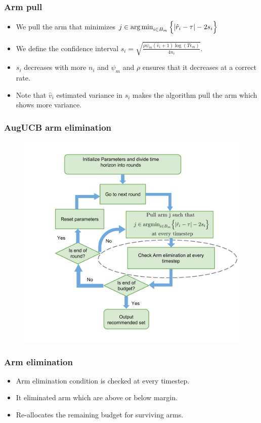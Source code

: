 \begin{frame}
\frametitle{Arm pull}
\begin{itemize}
\item<1-> We pull the arm that minimizes $j\in\operatorname*{arg\,min}_{i\in B_{m}}\Big\lbrace |\hat{r}_{i} - \tau | - 2s_{i}\Big\rbrace$
\item<2-> We define the confidence interval $s_i  = \sqrt{\frac{\rho\psi_m (\hat{v}_{i}+1) \log ( T \epsilon_{m})}{4 n_{i}}}$.
\item<3-> $s_i$ decreases with more $n_i$ and $\psi_m$ and $\rho$ ensures that it decreases at a correct rate.
\item<4-> Note that $\hat{v}_i$ estimated variance in $s_i$ makes the algorithm pull the arm which shows more variance. 
\end{itemize}
\end{frame}

\begin{frame}
\frametitle{AugUCB arm elimination}
\begin{figure}
\includegraphics[scale=0.24]{img/AugUCB_flow_elim.png}
\end{figure}
\end{frame}


\begin{frame}
\frametitle{Arm elimination}
\begin{itemize}
\item<1-> Arm elimination condition is checked at every timestep.
\item<2-> It eliminated arm which are above or below margin.
\item<3-> Re-allocates the remaining budget for surviving arms. 
\end{itemize}
\end{frame}


